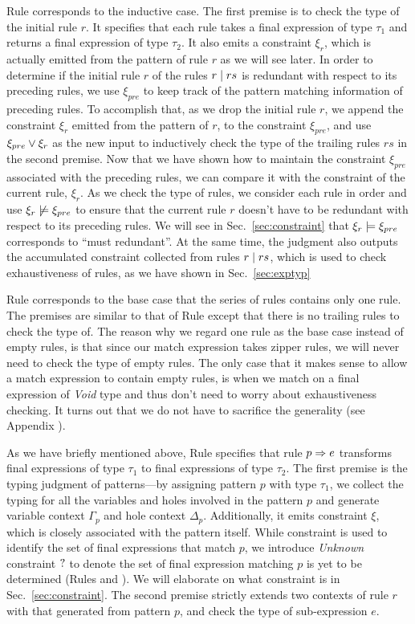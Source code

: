 \documentclass[runningheads,envcountsame,a4paper]{llncs}
\begin{document}
Rule \TRules corresponds to the inductive case. The first premise is to check
the type of the initial rule $r$. It specifies that each rule takes a final expression
of type $\tau_1$ and returns a final expression of type $\tau_2$. It also emits
a constraint $\xi_r$, which is actually emitted from the pattern of rule $r$ as
we will see later. In order to determine if the initial rule $r$ of the rules
$r \mid rs$ is redundant with respect to its preceding rules, we use
$\xi_{pre}$ to keep track of the pattern matching information of preceding
rules. To accomplish that, as we drop the initial rule $r$, we append the
constraint $\xi_r$ emitted from the pattern of $r$, to the constraint
$\xi_{pre}$, and use $\xi_{pre} \vee \xi_r$ as the new input to inductively check the type
of the trailing rules $rs$ in the second premise. Now that we have shown how to maintain the
constraint $\xi_{pre}$ associated with the preceding rules, we can compare it
with the constraint of the current rule, $\xi_r$. As we check the
type of rules, we consider each rule in order and use
$\xi_r \not\models \xi_{pre}$ to ensure that the current rule $r$ doesn't
have to be redundant with respect to its preceding rules. We will see in
Sec.~\ref{sec:constraint} that $\xi_r \models \xi_{pre}$ corresponds to
``must redundant''. At the same time, the judgment also outputs the accumulated
constraint collected from rules $r \mid rs$, which is used to check
exhaustiveness of rules, as we have shown in Sec.~\ref{sec:exptyp}

Rule \TOneRules corresponds to the base case that the series of rules contains
only one rule. The premises are similar to that of Rule \TRules except that
there is no trailing rules to check the type of. The reason why we regard one
rule as the base case instead of empty rules, is that since our match expression
takes zipper rules, we will never need to check the type of empty rules. The
only case that it makes sense to allow a match expression to contain empty
rules, is when we match on a final expression of \textit{Void} type and thus
don't need to worry about exhaustiveness checking. It turns out that we do not
have to sacrifice the generality (see Appendix ).

As we have briefly mentioned above, Rule \TRule specifies that rule
$p \Rightarrow e$ transforms final expressions of type $\tau_1$ to final expressions
of type $\tau_2$. The first premise is the typing judgment of patterns---by
assigning pattern $p$ with type $\tau_1$, we collect the typing for all the
variables and holes involved in the pattern $p$ and generate variable context
$\Gamma_p$ and hole context $\Delta_p$. Additionally, it emits constraint $\xi$,
which is closely associated with the pattern itself. While constraint is used to
identify the set of final expressions that match $p$, we introduce
\textit{Unknown} constraint $\mathtt{?}$ to denote the set of final expression
matching $p$ is yet to be determined (Rules \PTEHole and \PTHole). We will elaborate on what constraint is in
Sec.~\ref{sec:constraint}. The second premise strictly extends two contexts of
rule $r$ with that generated from pattern $p$, and check the type of
sub-expression $e$.
\end{document}
